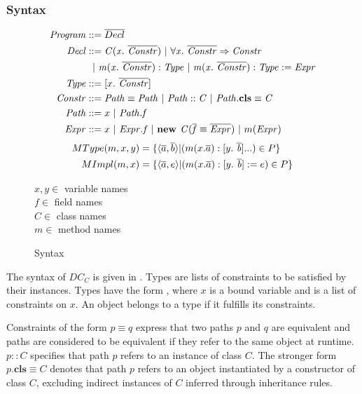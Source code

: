 \subsubsection{Syntax}
\begin{figure}[t]
\begin{align*}
\mathit{Program} &::= \ovl{Decl} \\
\mathit{Decl} &::= \constr{C}{x}{\overline{Constr}} %
                 \ |\ \progEnt{x}{\overline{Constr}}{Constr} \\
              &\ \ |\ \mDecl{m}{x}{\overline{Constr}}{Type} %
                 \ |\ \mImpl{m}{x}{\overline{Constr}}{Type}{Expr} \\ %
\mathit{Type} &::= \type{x}{\ovl{Constr}} \\
\mathit{Constr} &::= \pathEq{Path}{Path} %
                \ |\ \instOf{Path}{C} %
                \ |\ \instBy{Path}{C} \\ %
\mathit{Path} &::= x \ |\ \mathit{Path.f}\\
\mathit{Expr} &::= x
              \ |\ \mathit{Expr.f}
              \ |\ \newInst{C}{\overline{f}}{\overline{Expr}} %
              \ |\ m(\mathit{Expr})
\end{align*}
\begin{align*}
MType(m, x, y) &= \{ \langle\overline{a}, \overline{b}\rangle | (m(x. \overline{a}): [y.\ \mathit{\overline{b}}]...) \in P \} \\
MImpl(m, x) &= \{\langle\overline{a}, e\rangle | (m(x. \overline{a}): [y.\ \mathit{\overline{b}}] := e) \in P \}
\end{align*}

$x, y \in$ variable names\\
$f \in$ field names\\
$C \in$ class names\\
$m \in$ method names
\caption{Syntax}
\label{fig:dcc-syntax}
\end{figure}
The syntax of $DC_C$ is given in .
Types are lists of constraints to be satisfied by their instances.
Types have the form , where $x$ is a bound variable
and  is a list of constraints on $x$.
An object belongs to a type if it fulfills its constraints.

Constraints of the form $p \equiv q$ express that two paths $p$ and $q$ are equivalent
and paths are considered to be equivalent if they refer to the same object at runtime.
$p :: C$ specifies that path $p$ refers to an instance of class $C$.
The stronger form $p.\textbf{cls} \equiv C$ denotes that
path $p$ refers to an object instantiated by a constructor of class $C$,
excluding indirect instances of $C$ inferred through inheritance rules.

